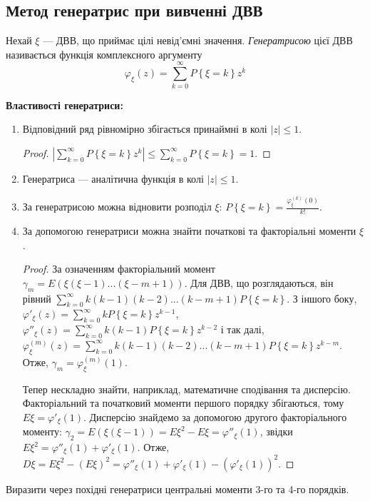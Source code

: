 \subsection{Метод генератрис при вивченні ДВВ}
\begin{definition}
    Нехай $\xi$ --- ДВВ, що приймає цілі невід'ємні значення. 
    \emph{Генератрисою} цієї ДВВ називається функція комплексного аргументу
    \begin{equation}\label{eq:gen_func}
        \varphi_\xi(z) = \sum\limits_{k=0}^{\infty} P\left\{\xi = k\right\} z^k
    \end{equation}
\end{definition}
\noindent \textbf{Властивості генератриси:}
\begin{enumerate}
    \item Відповідний ряд рівномірно збігається принаймні в колі $|z|\leq 1$.
    \begin{proof}
        $\left| \sum\limits_{k=0}^{\infty} P\left\{\xi = k\right\} z^k \right| \leq \sum\limits_{k=0}^{\infty} P\left\{\xi = k\right\} = 1$.
    \end{proof}
    \item Генератриса --- аналітична функція в колі $|z|\leq 1$.
    \item За генератрисою можна відновити розподіл $\xi$:
    $P\left\{\xi = k\right\} = \frac{\varphi_\xi^{(k)}(0)}{k!}$.
    \item За допомогою генератриси можна знайти початкові та факторіальні моменти $\xi$.
    \begin{proof}
        За означенням факторіальний момент $\gamma_m = E\left( \xi (\xi - 1) ... (\xi - m + 1)\right)$.
        Для ДВВ, що розглядаються, він рівний $\sum\limits_{k=0}^{\infty} k(k-1)(k-2)...(k-m+1) P\left\{\xi = k\right\}$.
        З іншого боку, $\varphi'_\xi(z) = \sum\limits_{k=0}^{\infty} k P\left\{\xi = k\right\} z^{k-1}$,
        $\varphi''_\xi(z) = \sum\limits_{k=0}^{\infty} k(k-1) P\left\{\xi = k\right\} z^{k-2}$ і так далі,
        $\varphi^{(m)}_\xi(z) = \sum\limits_{k=0}^{\infty} k(k-1)(k-2)...(k-m+1) P\left\{\xi = k\right\} z^{k-m}$.
        Отже, $\gamma_m = \varphi^{(m)}_\xi(1)$.
        
        Тепер нескладно знайти, наприклад, математичне сподівання та дисперсію.
        Факторіальний та початковий моменти першого порядку збігаються, тому $E\xi = \varphi'_\xi(1)$.
        Дисперсію знайдемо за допомогою другого факторіального моменту: $\gamma_2 = E\left( \xi (\xi - 1)\right) = E\xi^2 - E\xi = \varphi''_\xi(1)$,
        звідки $E\xi^2 = \varphi''_\xi(1) + \varphi'_\xi(1)$. 
        Отже, $D\xi = E\xi^2 - (E\xi)^2 = \varphi''_\xi(1) + \varphi'_\xi(1) - \left( \varphi'_\xi(1)\right)^2$.
    \end{proof}
\end{enumerate}
\begin{exercise}
    Виразити через похідні генератриси центральні моменти 3-го та 4-го порядків.
\end{exercise}
